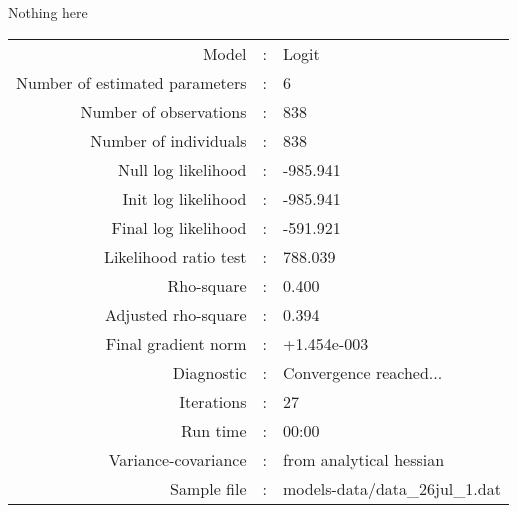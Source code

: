 Nothing here\\


\begin{flushleft}
\begin{tabular}{rcl}
\hline
Model &:& Logit\\
Number of estimated parameters&:&6\\
Number of  observations &:& 838\\
Number of individuals&:&838\\
Null log likelihood&:&-985.941\\
Init log likelihood&:&-985.941\\
Final log likelihood&:&-591.921\\
Likelihood ratio test &:&788.039\\
Rho-square&:&0.400\\
Adjusted rho-square&:&0.394\\
Final gradient norm&:&+1.454e-003\\
Diagnostic&:&Convergence reached...\\
Iterations&:&27\\
Run time&:&00:00\\
Variance-covariance&:&from analytical hessian
\\
Sample file&:&models-data/data_26jul_1.dat\\
\end{tabular}
\end{flushleft}

